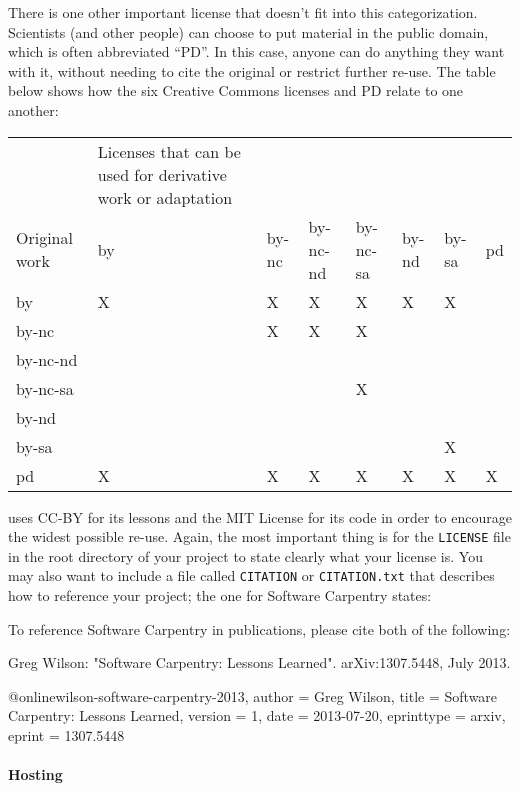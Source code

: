 \documentclass{book}
\begin{document}
There is one other important license that doesn't fit into this
categorization. Scientists (and other people) can choose to put material
in the public domain, which is often abbreviated ``PD''. In this case,
anyone can do anything they want with it, without needing to cite the
original or restrict further re-use. The table below shows how the six
Creative Commons licenses and PD relate to one another:

\begin{tabular}{llllllll}
& Licenses that can be used for derivative work or adaptation \\
Original work & by & by-nc & by-nc-nd & by-nc-sa & by-nd & by-sa & pd \\
by & X & X & X & X & X & X & \\
by-nc & & X & X & X & & & \\
by-nc-nd & & & & & & & \\
by-nc-sa & & & & X & & & \\
by-nd & & & & & & & \\
by-sa & & & & & & X & \\
pd & X & X & X & X & X & X & X \\
\end{tabular}

uses CC-BY for its lessons and the MIT License for its code in order to
encourage the widest possible re-use. Again, the most important thing is
for the \texttt{LICENSE} file in the root directory of your project to
state clearly what your license is. You may also want to include a file
called \texttt{CITATION} or \texttt{CITATION.txt} that describes how to
reference your project; the one for Software Carpentry states:

\begin{VerbFile}
To reference Software Carpentry in publications, please cite both of the following:

Greg Wilson: "Software Carpentry: Lessons Learned". arXiv:1307.5448, July 2013.

@online{wilson-software-carpentry-2013,
  author      = {Greg Wilson},
  title       = {Software Carpentry: Lessons Learned},
  version     = {1},
  date        = {2013-07-20},
  eprinttype  = {arxiv},
  eprint      = {1307.5448}
}
\end{VerbFile}

\mbox{}\paragraph{Hosting}
\end{document}
